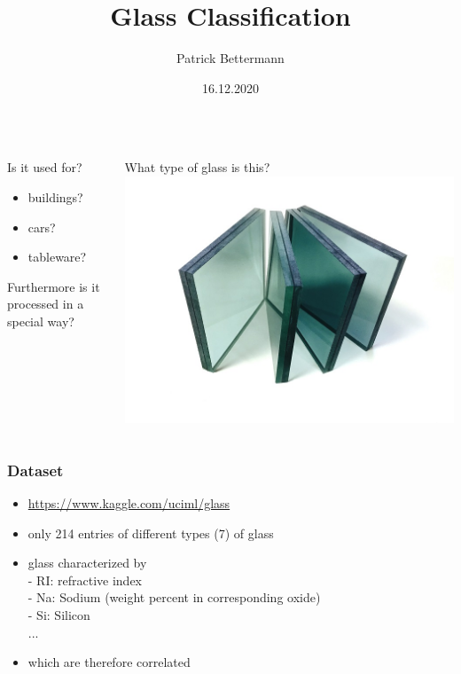\documentclass{beamer}
\title{Glass Classification}
\author{Patrick Bettermann}
\date{16.12.2020}
\begin{document}
\frame{\titlepage}

\begin{frame}
\frametitle{}
  \begin{columns}[T]
    \begin{column}{.5\textwidth}
     \begin{block}{Is it used for?}
     	\begin{itemize}
     	\item{buildings?}
     	\item{cars?}
     	\item{tableware?}
     	\end{itemize}
     \end{block}
     \begin{block}{Furthermore}
     	is it processed in a special 
     	way?
     \end{block}
    \end{column}
    \begin{column}{.5\textwidth}
    \begin{block}{What type of glass 
    is this?}
    \includegraphics[]{glass.jpg}
    \end{block}
    \end{column}
  \end{columns}
\end{frame}

\begin{frame}
\frametitle{Dataset}
\begin{itemize}
\item{\url{https://www.kaggle.com/uciml/glass}}
\item{only 214 entries of different types (7) of glass}
\item{glass characterized by \\
- RI: refractive index\\
- Na: Sodium (weight percent in corresponding oxide)\\
- Si: Silicon\\
 ...}
\item{which are therefore correlated}
\end{itemize}
\end{frame}
\end{document}
